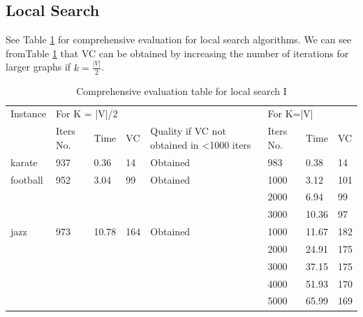 \subsection{Local Search}
See Table \ref{tab2} for comprehensive evaluation for local search algorithms. We can see fromTable \ref{tab2} that VC can be obtained by increasing the number of iterations for larger graphs if $k=\frac{\left| V \right|}{2}$.
\begin{table}[htb]
\caption{Comprehensive evaluation table for local search I}
\label{tab2}
\begin{minipage}{\columnwidth}
\begin{center}
\begin{tabular}{@{}llllllll@{}}
\toprule
Instance      & \multicolumn{4}{l}{For K = |V|/2}                                             & \multicolumn{3}{l}{For K=|V|} \\ 
              & Iters No. & Time   & VC  & Quality if VC not obtained in \textless 1000 iters & Iters No.   & Time     & VC   \\ \midrule
karate        & 937       & 0.36   & 14  & Obtained                                           & 983         & 0.38     & 14   \\ \midrule
football      & 952       & 3.04   & 99  & Obtained                                           & 1000        & 3.12     & 101  \\
              &           &        &     &                                                    & 2000        & 6.94     & 99   \\
              &           &        &     &                                                    & 3000        & 10.36    & 97   \\ \midrule
jazz          & 973       & 10.78  & 164 & Obtained                                           & 1000        & 11.67    & 182  \\
              &           &        &     &                                                    & 2000        & 24.91    & 175  \\
              &           &        &     &                                                    & 3000        & 37.15    & 175  \\
              &           &        &     &                                                    & 4000        & 51.93    & 170  \\
              &           &        &     &                                                    & 5000        & 65.99    & 169  \\ \midrule

\end{tabular}
\end{center}
\end{minipage}
\end{table}
